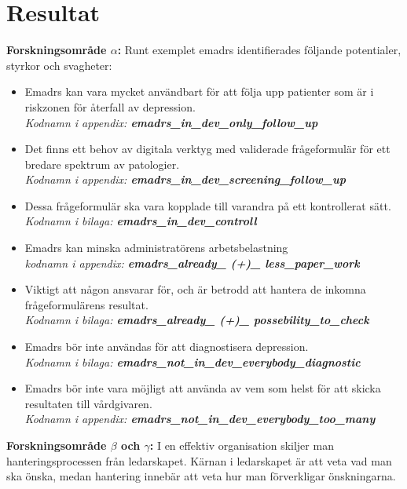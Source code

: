 \documentclass[12pt,a4paper,oneside]{article}
\let\oldcite\cite
\renewcommand*\cite[1]{\textsuperscript{\oldcite{#1}}}
\begin{document}
\section*{Resultat}
{\bf Forskningsomr{\aa}de $\alpha$:} Runt exemplet e{\sc madrs} identifierades f{\"o}ljande potentialer, styrkor och svagheter:
\begin{itemize}
\item E{\sc madrs} kan vara mycket anv{\"a}ndbart f{\"o}r att f{\"o}lja upp patienter som {\"a}r i riskzonen f{\"o}r {\aa}terfall av depression. \\{\it Kodnamn i appendix: {\bfseries emadrs\_in\_dev\_only\_follow\_up}}
\item Det finns ett behov av digitala verktyg med validerade fr{\aa}geformul{\"a}r f{\"o}r ett bredare spektrum av patologier. \\{\it Kodnamn i appendix: {\bfseries emadrs\_in\_dev\_screening\_follow\_up}}
\item Dessa fr{\aa}geformul{\"a}r ska vara kopplade till varandra p{\aa} ett kontrollerat s{\"a}tt. \\{\it Kodnamn i bilaga: {\bfseries emadrs\_in\_dev\_controll}}
\item E{\sc madrs} kan minska administrat{\"o}rens arbetsbelastning \\{\it kodnamn i appendix: {\bfseries emadrs\_already\_ (+)\_ less\_paper\_work}}
\item Viktigt att n{\aa}gon ansvarar f{\"o}r, och {\"a}r betrodd att hantera de inkomna fr{\aa}geformul{\"a}rens resultat. \\{\it Kodnamn i bilaga: {\bfseries emadrs\_already\_ (+)\_ possebility\_to\_check}}
\item E{\sc madrs} b{\"o}r inte anv{\"a}ndas f{\"o}r att diagnostisera depression. \\{\it Kodnamn i bilaga: {\bfseries emadrs\_not\_in\_dev\_everybody\_diagnostic}}
\item E{\sc madrs} b{\"o}r inte vara m{\"o}jligt att anv{\"a}nda av vem som helst f{\"o}r att skicka resultaten till v{\aa}rdgivaren. \\{\it Kodnamn i appendix: {\bfseries emadrs\_not\_in\_dev\_everybody\_too\_many}}
\end{itemize}
{\bf Forskningsomr{\aa}de $\beta$ och $\gamma$:} I en effektiv organisation skiljer man hanteringsprocessen fr{\aa}n ledarskapet\cite {leader1}.
K{\"a}rnan i ledarskapet {\"a}r att veta vad man ska {\"o}nska, medan hantering inneb{\"a}r att veta hur man f{\"o}rverkligar {\"o}nskningarna.
\end{document}
